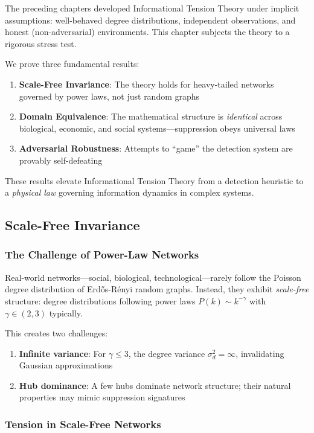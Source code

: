 \documentclass[12pt,a4paper]{article}
\theoremstyle{definition}
\theoremstyle{remark}
\begin{document}
The preceding chapters developed Informational Tension Theory under implicit assumptions: well-behaved degree distributions, independent observations, and honest (non-adversarial) environments. This chapter subjects the theory to a rigorous stress test.

We prove three fundamental results:
\begin{enumerate}
    \item \textbf{Scale-Free Invariance}: The theory holds for heavy-tailed networks governed by power laws, not just random graphs
    \item \textbf{Domain Equivalence}: The mathematical structure is \emph{identical} across biological, economic, and social systems—suppression obeys universal laws
    \item \textbf{Adversarial Robustness}: Attempts to ``game'' the detection system are provably self-defeating
\end{enumerate}

These results elevate Informational Tension Theory from a detection heuristic to a \emph{physical law} governing information dynamics in complex systems.

\subsection{Scale-Free Invariance}

\subsubsection{The Challenge of Power-Law Networks}

Real-world networks—social, biological, technological—rarely follow the Poisson degree distribution of Erdős-Rényi random graphs. Instead, they exhibit \emph{scale-free} structure: degree distributions following power laws $P(k) \sim k^{-\gamma}$ with $\gamma \in (2, 3)$ typically.

This creates two challenges:
\begin{enumerate}
    \item \textbf{Infinite variance}: For $\gamma \leq 3$, the degree variance $\sigma_d^2 = \infty$, invalidating Gaussian approximations
    \item \textbf{Hub dominance}: A few hubs dominate network structure; their natural properties may mimic suppression signatures
\end{enumerate}

\subsubsection{Tension in Scale-Free Networks}
\end{document}
